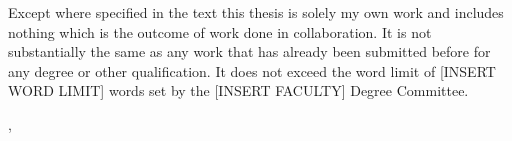 \begin{vplace}[0.1]
	\thispagestyle{plain}
	\noindent{}Except where specified in the text this thesis is solely my own work and includes nothing which is the outcome of work done in collaboration.
	It is not substantially the same as any work that has already been submitted before for any degree or other qualification.
	It does not exceed the word limit of [INSERT WORD LIMIT] words set by the [INSERT FACULTY] Degree Committee.

	\null\hfill \myname{}, \submissiondate{}
\end{vplace}



